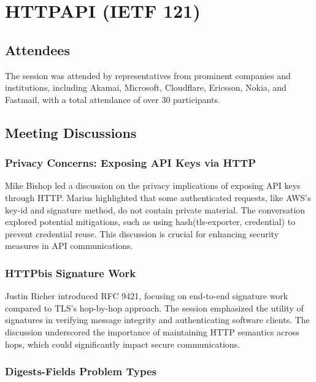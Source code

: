 \documentclass{article}
\begin{document}
\newpage

\section{HTTPAPI (IETF 121)}

\subsection{Attendees}

The session was attended by representatives from prominent companies and institutions, including Akamai, Microsoft, Cloudflare, Ericsson, Nokia, and Fastmail, with a total attendance of over 30 participants.

\subsection{Meeting Discussions}

\subsubsection{Privacy Concerns: Exposing API Keys via HTTP}

Mike Bishop led a discussion on the privacy implications of exposing API keys through HTTP. Marius highlighted that some authenticated requests, like AWS's key-id and signature method, do not contain private material. The conversation explored potential mitigations, such as using hash(tls-exporter, credential) to prevent credential reuse. This discussion is crucial for enhancing security measures in API communications.

\subsubsection{HTTPbis Signature Work}

Justin Richer introduced RFC 9421, focusing on end-to-end signature work compared to TLS's hop-by-hop approach. The session emphasized the utility of signatures in verifying message integrity and authenticating software clients. The discussion underscored the importance of maintaining HTTP semantics across hops, which could significantly impact secure communications.

\subsubsection{Digests-Fields Problem Types}
\end{document}
